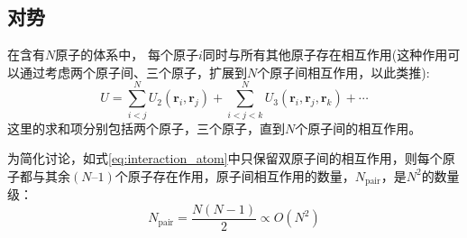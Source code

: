 \subsection{对势}
在含有$N$原子的体系中，%
每个原子$i$同时与所有其他原子存在相互作用(这种作用可以通过考虑两个原子间、三个原子，扩展到$N$个原子间相互作用，以此类推):
\begin{equation}
	U=\sum_{i<j}^NU_2(\mathbf{r}_i,\mathbf{r}_j)+\sum_{i<j<k}^NU_3(\mathbf{r}_i,\mathbf{r}_j,\mathbf{r}_k)+\cdots
	\label{eq:interaction_atom}
\end{equation}
这里的求和项分别包括两个原子，三个原子，直到$N$个原子间的相互作用。%

为简化讨论，如式\eqref{eq:interaction_atom}中只保留双原子间的相互作用，则每个原子都与其余$(N–1)$个原子存在作用，原子间相互作用的数量，$N_{\mathrm{pair}}$，是$N^2$的数量级：
\begin{equation}
	N_{\mathrm{pair}}=\dfrac{N(N-1)}2\propto O(N^2)
	\label{eq:interaction_atom_range}
\end{equation}

